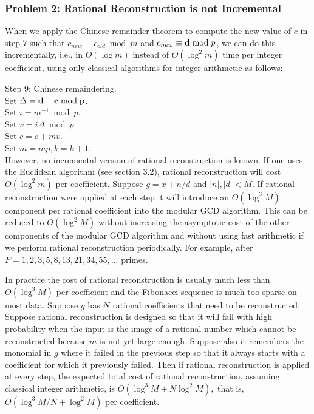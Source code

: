 \documentclass[10pt]{article}
\begin{document}
\subsubsection*{Problem 2: Rational Reconstruction is not Incremental}

When we apply the Chinese remainder theorem to compute the new
value of $c$ in step 7 such that $c_{new} \equiv c_{old} \bmod m$ and
$c_{new} \equiv {\bf d} \bmod p$, we can do this incrementally, i.e.,
in $O( \log m )$ instead of $O( \log^2 m )$ time per integer coefficient,
using only classical algorithms for integer arithmetic as follows:

\medskip
\noindent
\hspace*{2mm}    Step 9: Chinese remaindering. \\
\hspace*{2mm}    Set $\Delta = \bf d - c \bmod p$.   \\  \hspace*{2mm}    Set $i = m^{-1} \bmod p$. \\
\hspace*{2mm}    Set $v = i \Delta \bmod p$. \\
\hspace*{2mm}    Set $c = c + m v$. \\
\hspace*{2mm}    Set $m = m p, k = k+1.$ \\

\noindent
However, no incremental version of rational reconstruction is known.
If one uses the Euclidean algorithm (see section 3.2), rational reconstruction will
cost $O( \log^2 m )$ per coefficient.  Suppose $g = x + n/d$ and $|n|,|d|<M$.
If rational reconstruction were applied at each step it will
introduce an $O( \log^3 M )$ component per rational coefficient
into the modular GCD algorithm.
This can be reduced to $O( \log^2 M )$ without increasing
the asymptotic cost of the other components of the modular GCD
algorithm and without using fast arithmetic
if we perform rational reconstruction periodically.
For example, after $F = 1, 2, 3, 5, 8, 13, 21, 34, 55, ...$  primes.

In practice the cost of rational reconstruction is
usually much less than $O( \log^3 M )$ per coefficient and the
Fibonacci sequence is much too sparse on most data.
Suppose $g$ has $N$ rational coefficients that need to be
reconstructed. Suppose rational reconstruction is designed so that
it will fail with high probability when the input is the image of a
rational number which cannot be reconstructed because $m$ is not yet
large enough. Suppose also it remembers the monomial in $g$ where it
failed in the previous step so that it always starts with a
coefficient for which it previously failed. Then if rational
reconstruction is applied at every step, the expected total cost of
rational reconstruction, assuming classical integer arithmetic, is
$O( \log^3 M + N \log^2 M ),$ that is, $O( \log^3 M / N + \log^2 M
)$ per coefficient.
\end{document}
